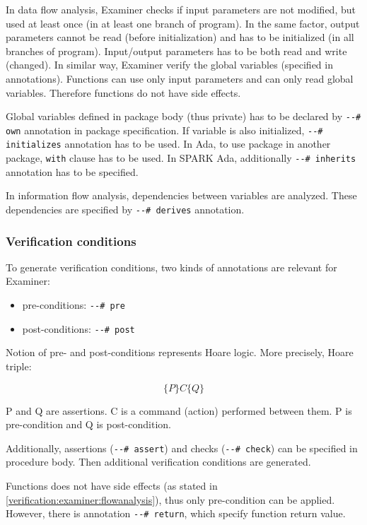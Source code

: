In data flow analysis, Examiner checks if input parameters are not modified, but used at least once (in at least one branch of program). In the same factor, output parameters cannot be read (before initialization) and has to be initialized (in all branches of program). Input/output parameters has to be both read and write (changed). In similar way, Examiner verify the global variables (specified in annotations). Functions can use only input parameters and can only read global variables. Therefore functions do not have side effects. 

Global variables defined in package body (thus private) has to be declared by \lstinline{--# own} annotation in package specification. If variable is also initialized, \lstinline{--# initializes} annotation has to be used. In Ada, to use package in another package, \lstinline{with} clause has to be used. In SPARK Ada, additionally \lstinline{--# inherits} annotation has to be specified.

In information flow analysis, dependencies between variables are analyzed. These dependencies are specified by \lstinline{--# derives} annotation.


\subsubsection{Verification conditions}
\label{verification:examiner:vc}

To generate verification conditions, two kinds of annotations are relevant for Examiner:
\begin{itemize}
	\item pre-conditions: \lstinline{--# pre}
	\item post-conditions: \lstinline{--# post}
\end{itemize}

Notion of pre- and post-conditions represents Hoare logic. More precisely, Hoare triple: 

\begin{equation} \label{eq:hoare_triple}
	\{P\} C \{Q\}
\end{equation}

P and Q are assertions. C is a command (action) performed between them. P is pre-condition and Q is post-condition.

Additionally, assertions (\lstinline{--# assert}) and checks (\lstinline{--# check}) can be specified in procedure body. Then additional verification conditions are generated.

Functions does not have side effects (as stated in \ref{verification:examiner:flowanalysis}), thus only pre-condition can be applied. However, there is annotation \lstinline{--# return}, which specify function return value.

